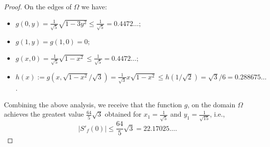 \documentclass[10pt,a4paper]{amsart}
\begin{document}
\begin{proof}
\medskip

On the edges of $\Omega$ we have:
\begin{itemize}
  \item[-] $g(0,y)=\frac{1}{\sqrt5}\sqrt{1-3 y^2}\le \frac{1}{\sqrt5} = 0.4472\ldots;$
  \item[-] $g(1,y) = g(1,0) = 0$;
  \item[-] $g(x,0) = \frac{1}{\sqrt5}\sqrt{1-x^2}\le \frac{1}{\sqrt5} = 0.4472\ldots;$
  \item[-] $h(x):=g\left(x, \sqrt{1-x^2}/\sqrt3\right) = \frac{1}{\sqrt3}x\sqrt{1-x^2}\le h(1/\sqrt2) = \sqrt3/6 = 0.288675\ldots$.
\end{itemize}
Combining the above analysis, we receive that the function $g$, on the domain $\Omega$ achieves the greatest value $\frac{64}{5}\sqrt{3}$ obtained for $x_1=\frac{1}{\sqrt5}$ and $y_1=\frac{1}{\sqrt{15}}$, i.e.,
\[|S'_{f}(0)|\leq \frac{64}{5}\sqrt{3}=22.17025\ldots.\]
\end{proof}
\end{document}
